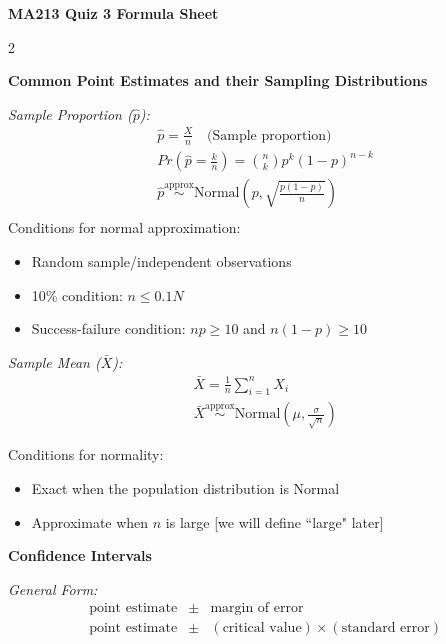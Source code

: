 \documentclass[8pt]{article}
\begin{document}
\begin{center}
    {\LARGE \textbf{MA213 Quiz 3 Formula Sheet}}
\end{center}

\vspace{1em}





\clearpage

\begin{multicols}{2} %

\textbf{Common Point Estimates and their Sampling Distributions}

\textit{Sample Proportion ($\hat{p}$):}
\begin{align*}
    &\hat{p} = \frac{X}{n} \quad \text{(Sample proportion)} \\
    &Pr\left(\hat{p}=\frac{k}{n}\right) = \binom{n}{k} p^k (1-p)^{n-k} \\
    &\hat{p} \stackrel{\text{approx}}{\sim} \text{Normal}\left(p, \sqrt{\frac{p(1-p)}{n}}\right) \\
\end{align*}
Conditions for normal approximation: 
\begin{itemize}
    \item Random sample/independent observations
    \item 10\% condition: $n \leq 0.1N$
    \item Success-failure condition: $np \ge 10$ and $n(1-p) \ge 10$
\end{itemize}

\textit{Sample Mean ($\bar{X}$):}
\begin{align*}
    &\bar{X} = \frac{1}{n} \sum_{i=1}^{n} X_i \\
    &\bar{X} \stackrel{\text{approx}}{\sim} \text{Normal}\left(\mu, \frac{\sigma}{\sqrt{n}}\right)
\end{align*}

Conditions for normality:
\begin{itemize}
    \item Exact when the population distribution is Normal
    \item Approximate when $n$ is large [we will define ``large" later]
\end{itemize}
\columnbreak
\textbf{Confidence Intervals}

\textit{General Form:}
\begin{align*}
    &\text{point estimate} &\pm& \text{margin of error} \\
    &\text{point estimate} &\pm& (\text{critical value}) \times (\text{standard error})
\end{align*}


\end{multicols}
\end{document}
